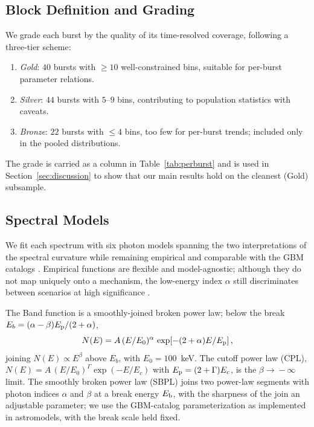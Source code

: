 \subsection{Block Definition and Grading} \label{sec:grade}
We grade each burst by the quality of its time-resolved coverage, following a
three-tier scheme:
\begin{enumerate}
\item \emph{Gold}: $40$ bursts with $\ge10$ well-constrained
  bins, suitable for per-burst parameter relations.
\item \emph{Silver}: $44$ bursts with $5$--$9$ bins, contributing to
  population statistics with caveats.
\item \emph{Bronze}: $22$ bursts with $\le4$ bins, too few for per-burst
  trends; included only in the pooled distributions.
\end{enumerate}
The grade is carried as a column in Table~\ref{tab:perburst} and is used in
Section~\ref{sec:discussion} to show that our main results hold on the cleanest
(Gold) subsample.

\subsection{Spectral Models} \label{sec:models}
We fit each spectrum with six photon models spanning the two interpretations of
the spectral curvature while remaining empirical and comparable with the GBM
catalogs \citep[e.g.,][]{Kaneko2006,Gruber2014}. Empirical functions are flexible
and model-agnostic; although they do not map uniquely onto a mechanism, the
low-energy index $\alpha$ still discriminates between scenarios at high
significance \citep[e.g.,][]{Acuner2020}.

The Band function \citep{Band1993} is a smoothly-joined broken power law; below
the break $E_b=(\alpha-\beta)E_{\rm p}/(2+\alpha)$,
\begin{equation}
N(E)=A\,(E/E_0)^{\alpha}\,\exp\!\left[-(2+\alpha)E/E_{\rm p}\right],
\end{equation}
joining $N(E)\propto E^{\beta}$ above $E_b$, with $E_0=100$~keV. The cutoff power
law (CPL), $N(E)=A\,(E/E_0)^{\Gamma}\exp(-E/E_c)$ with $E_{\rm p}=(2+\Gamma)E_c$, is the
$\beta\!\to\!-\infty$ limit. The smoothly broken power law (SBPL) joins two
power-law segments with photon indices $\alpha$ and $\beta$ at a break energy
$E_{\rm b}$, with the sharpness of the join an adjustable parameter; we use
the GBM-catalog parameterization \citep{Kaneko2006} as implemented in
\textsf{astromodels}, with the break scale held fixed.

